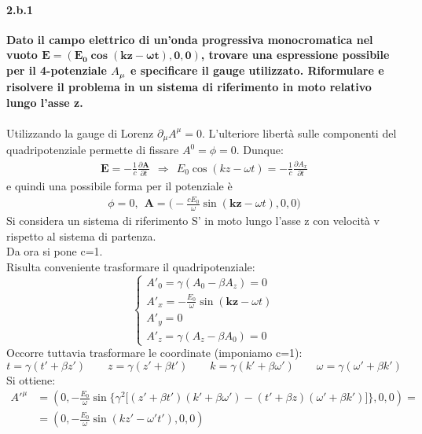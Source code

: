 \documentclass[twoside]{article}
\begin{document}
\paragraph{2.b.1}\textbf{Dato il campo elettrico di un'onda progressiva monocromatica nel vuoto $\mathbf{E= ( E_0 \cos{(kz-\omega t)}, 0, 0 )} $, trovare una espressione possibile per il 4-potenziale $\tensor{A}{_\mu}$ e specificare il gauge utilizzato. Riformulare e risolvere il problema in un sistema di riferimento in moto relativo lungo l'asse z.}\\   
\\
Utilizzando la gauge di Lorenz $\partial_\mu A^\mu =0$. L'ulteriore libertà sulle componenti del quadripotenziale permette di fissare $A^0=\phi=0$.
Dunque:
\begin{align*}
    \mathbf{E}=-\frac{1}{c}\frac{\partial \mathbf{A}}{\partial t}\ \ \Rightarrow\ \  E_0 \cos{(kz-\omega t)}=-\frac{1}{c}\frac{\partial A_x}{\partial t}
\end{align*}
e quindi una possibile forma per il potenziale è
\begin{align*}
    \phi=0,\ \ \mathbf{A}=\biggl(-\frac{cE_0}{\omega}\sin{(\mathbf{kz}-\omega t)},0,0\biggr)
\end{align*}
Si considera un sistema di riferimento S' in moto lungo l'asse z con velocità v rispetto al sistema di partenza.\\
Da ora si pone c=1.\\
Risulta conveniente trasformare il quadripotenziale:
\begin{equation}
    \begin{cases}
    A'_0=\gamma(A_0-\beta A_z)=0\\
    A'_x=-\frac{E_0}{\omega}\sin{(\mathbf{kz}-\omega t)}\\
    A'_y=0\\
    A'_z=\gamma(A_z-\beta A_0)=0
    \end{cases}
\end{equation}
Occorre tuttavia trasformare le coordinate (imponiamo c=1):
\begin{equation}
    t=\gamma(t'+\beta z') \qquad z=\gamma(z'+\beta t') \qquad k=\gamma(k'+\beta \omega') \qquad \omega=\gamma(\omega'+\beta k')
\end{equation}
Si ottiene:
\begin{align}
    {A'}^\mu&=(0,-\frac{E_0}{\omega}\sin{\biggl\{\gamma^2\biggl[(z'+\beta t')(k'+\beta \omega')-(t'+\beta z)(\omega'+\beta k')\biggr]\biggr\}},0,0)=\\
    &=(0,-\frac{E_0}{\omega}\sin{(kz'-\omega't')},0,0)
\end{align}
\end{document}
